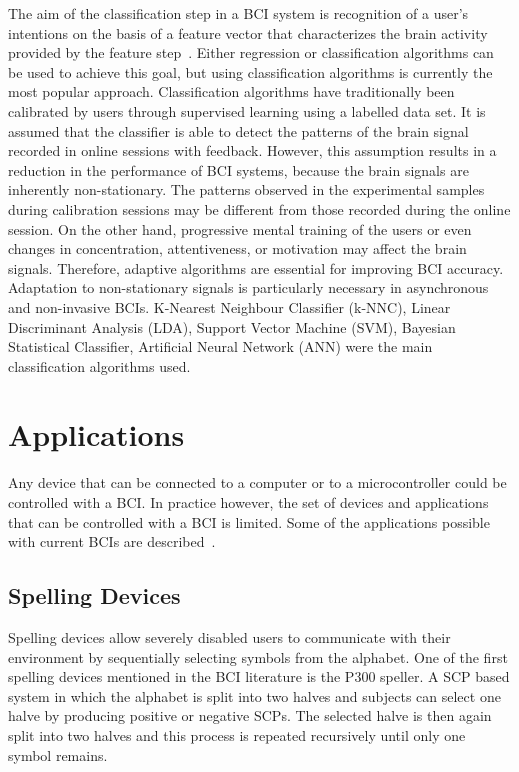The aim of the classification step in a BCI system is recognition of a user's intentions on the basis of a feature vector that characterizes the brain activity provided by the feature step~\cite{9}. Either regression or classification algorithms can be used to achieve this goal, but using classification algorithms is currently the most popular approach. Classification algorithms have traditionally been calibrated by users through supervised learning using a labelled data set. It is assumed that the classifier is able to detect the patterns of the brain signal recorded in online sessions with feedback. However, this assumption results in a reduction in the performance of BCI systems, because the brain signals are inherently non-stationary. The patterns observed in the experimental samples during calibration sessions may be different from those recorded during the online session. On the other hand, progressive mental training of the users or even changes in concentration, attentiveness, or motivation may affect the brain signals. Therefore, adaptive algorithms are essential for improving BCI accuracy. Adaptation to non-stationary signals is particularly necessary in asynchronous and non-invasive BCIs. K-Nearest Neighbour Classifier (k-NNC), Linear Discriminant Analysis (LDA), Support Vector Machine (SVM), Bayesian Statistical Classifier, Artificial Neural Network (ANN) were the main classification algorithms used.

\section{Applications}

Any device that can be connected to a computer or to a microcontroller could be controlled with a BCI. In practice however, the set of devices and applications that can be controlled with a BCI is limited. Some of the applications possible with current BCIs are described~\cite{1}.

\subsection{Spelling Devices}
 
Spelling devices allow severely disabled users to communicate with their environment by sequentially selecting symbols from the alphabet. One of the first spelling devices mentioned in the BCI literature is the P300 speller. A SCP based system in which the alphabet is split into two halves and subjects can select one halve by producing positive or negative SCPs. The selected halve is then again split into two halves and this process is repeated recursively until only one symbol remains. 

